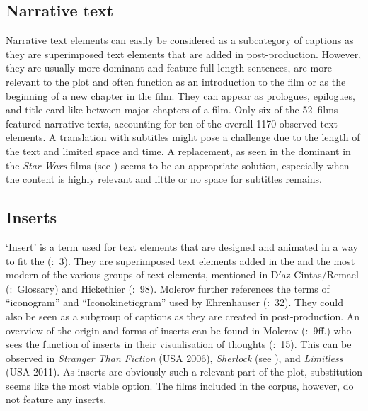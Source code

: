 \subsection{Narrative text}\label{sec:2.4.5}

Narrative text elements can easily be considered as a subcategory of captions as they are superimposed text elements that are added in post-production. However, they are usually more dominant and feature full-length sentences, are more relevant to the plot and often function as an introduction to the film or as the beginning of a new chapter in the film. They can appear as prologues, epilogues, and title card-like between major chapters of a film. Only six of the 52~films featured narrative texts, accounting for ten of the overall 1170 observed text elements. A translation with subtitles might pose a challenge due to the length of the text and limited space and time. A replacement, as seen in the dominant  in the \textit{Star Wars} films (see ) seems to be an appropriate solution, especially when the content is highly relevant and little or no space for subtitles remains.

\subsection{Inserts}\label{sec:2.4.6}

‘Insert’ is a term used for text elements that are designed and animated in a way to fit the  (\citealt{molerov2012}:~3). They are superimposed text elements added in the  and the most modern of the various groups of text elements, mentioned in Díaz Cintas/Remael (\citeyear{Diaz_cintas2007}:~Glossary) and Hickethier (\citeyear{Hickethier2007}:~98). Molerov further references the terms of “iconogram” and “Iconokineticgram” used by Ehrenhauser (\citeyear{Ehrenhauser2007}:~32). They could also be seen as a subgroup of captions as they are created in post-production. An overview of the origin and forms of inserts can be found in Molerov (\citeyear{molerov2012}:~9ff.) who sees the  function of inserts in their visualisation of thoughts (\citeyear{molerov2012}:~15). This can be observed in \textit{Stranger Than Fiction} (USA 2006), \textit{Sherlock} (see ), and \textit{Limitless} (USA 2011). As inserts are obviously such a relevant part of the plot, substitution seems like the most viable option. The films included in the corpus, however, do not feature any inserts.

